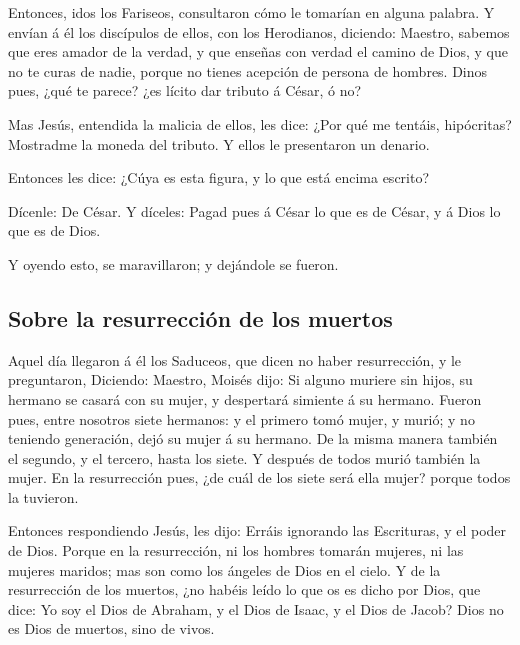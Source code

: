  Entonces, idos los Fariseos, consultaron cómo le
tomarían en alguna palabra.  Y envían á él los discípulos
de ellos, con los Herodianos, diciendo: Maestro, sabemos que eres amador
de la verdad, y que enseñas con verdad el camino de Dios, y que no te
curas de nadie, porque no tienes acepción de persona de hombres.
 Dinos pues, ¿qué te parece? ¿es lícito dar tributo á
César, ó no?

 Mas Jesús, entendida la malicia de ellos, les dice: ¿Por
qué me tentáis, hipócritas?  Mostradme la moneda del
tributo. Y ellos le presentaron un denario.

 Entonces les dice: ¿Cúya es esta figura, y lo que está
encima escrito?

 Dícenle: De César. Y díceles: Pagad pues á César lo que
es de César, y á Dios lo que es de Dios.

 Y oyendo esto, se maravillaron; y dejándole se fueron.

\hypertarget{sobre-la-resurrecciuxf3n-de-los-muertos}{%
\subsection{Sobre la resurrección de los
muertos}\label{sobre-la-resurrecciuxf3n-de-los-muertos}}

 Aquel día llegaron á él los Saduceos, que dicen no haber
resurrección, y le preguntaron,  Diciendo: Maestro,
Moisés dijo: Si alguno muriere sin hijos, su hermano se casará con su
mujer, y despertará simiente á su hermano.  Fueron pues,
entre nosotros siete hermanos: y el primero tomó mujer, y murió; y no
teniendo generación, dejó su mujer á su hermano.  De la
misma manera también el segundo, y el tercero, hasta los siete.
 Y después de todos murió también la mujer.
 En la resurrección pues, ¿de cuál de los siete será ella
mujer? porque todos la tuvieron.

 Entonces respondiendo Jesús, les dijo: Erráis ignorando
las Escrituras, y el poder de Dios.  Porque en la
resurrección, ni los hombres tomarán mujeres, ni las mujeres maridos;
mas son como los ángeles de Dios en el cielo.  Y de la
resurrección de los muertos, ¿no habéis leído lo que os es dicho por
Dios, que dice:  Yo soy el Dios de Abraham, y el Dios de
Isaac, y el Dios de Jacob? Dios no es Dios de muertos, sino de vivos.

